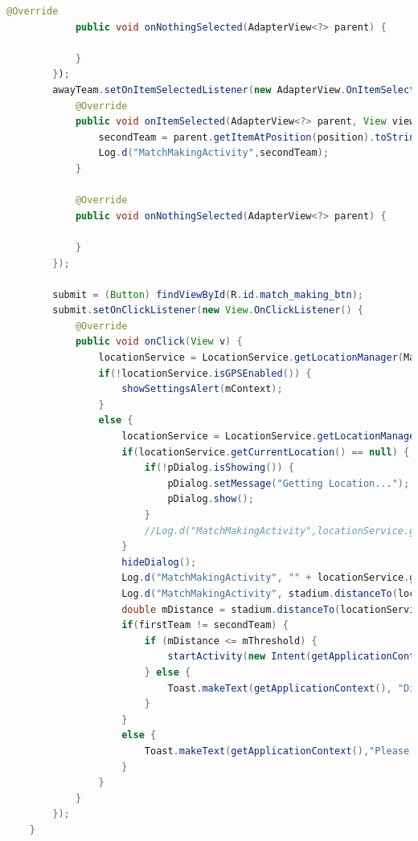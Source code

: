 \documentclass{article}
\begin{document}
\begin{landscape}
\begin{lstlisting}[language=Java,basicstyle=\tiny]
            @Override
            public void onNothingSelected(AdapterView<?> parent) {

            }
        });
        awayTeam.setOnItemSelectedListener(new AdapterView.OnItemSelectedListener() {
            @Override
            public void onItemSelected(AdapterView<?> parent, View view, int position, long id) {
                secondTeam = parent.getItemAtPosition(position).toString();
                Log.d("MatchMakingActivity",secondTeam);
            }

            @Override
            public void onNothingSelected(AdapterView<?> parent) {

            }
        });

        submit = (Button) findViewById(R.id.match_making_btn);
        submit.setOnClickListener(new View.OnClickListener() {
            @Override
            public void onClick(View v) {
                locationService = LocationService.getLocationManager(MatchMakingActivity.this);
                if(!locationService.isGPSEnabled()) {
                    showSettingsAlert(mContext);
                }
                else {
                    locationService = LocationService.getLocationManager(MatchMakingActivity.this);
                    if(locationService.getCurrentLocation() == null) {
                        if(!pDialog.isShowing()) {
                            pDialog.setMessage("Getting Location...");
                            pDialog.show();
                        }
                        //Log.d("MatchMakingActivity",locationService.getCurrentLocation() + "");
                    }
                    hideDialog();
                    Log.d("MatchMakingActivity", "" + locationService.getCurrentLocation());
                    Log.d("MatchMakingActivity", stadium.distanceTo(locationService.getCurrentLocation()) + "");
                    double mDistance = stadium.distanceTo(locationService.getCurrentLocation());
                    if(firstTeam != secondTeam) {
                        if (mDistance <= mThreshold) {
                            startActivity(new Intent(getApplicationContext(), StreamActivity.class));
                        } else {
                            Toast.makeText(getApplicationContext(), "Distance from stadium: " + mDistance, Toast.LENGTH_LONG).show();
                        }
                    }
                    else {
                        Toast.makeText(getApplicationContext(),"Please choose a different Away Team",Toast.LENGTH_LONG).show();
                    }
                }
            }
        });
    }


\end{lstlisting}
\end{landscape}
\end{document}
